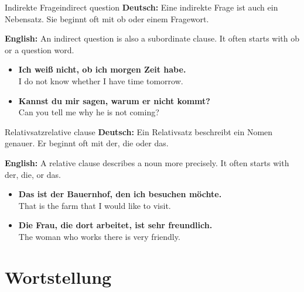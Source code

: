 \documentclass[a4paper,11pt]{article}
\newcommand{\GermanText}[1]{\textbf{Deutsch: }#1\par}
\newcommand{\EnglishText}[1]{{\small\color{SoftGray}\textbf{English: }#1\par}}
\newcommand{\ExampleItem}[2]{\item \textbf{#1}\\{\small\color{SoftGray}#2}}
\begin{document}
        \begin{grammarentry}{Indirekte Frage}{indirect question}
            \GermanText{Eine indirekte Frage ist auch ein Nebensatz. Sie beginnt oft mit ob oder einem Fragewort.}
            \EnglishText{An indirect question is also a subordinate clause. It often starts with ob or a question word.}
            
            \begin{exbox}
                \begin{itemize}
                    \ExampleItem{Ich weiß nicht, ob ich morgen Zeit habe.}{I do not know whether I have time tomorrow.}
                    \ExampleItem{Kannst du mir sagen, warum er nicht kommt?}{Can you tell me why he is not coming?}
                \end{itemize}
            \end{exbox}
        \end{grammarentry}
        
        \begin{grammarentry}{Relativsatz}{relative clause}
            \GermanText{Ein Relativsatz beschreibt ein Nomen genauer. Er beginnt oft mit der, die oder das.}
            \EnglishText{A relative clause describes a noun more precisely. It often starts with der, die, or das.}
            
            \begin{exbox}
                \begin{itemize}
                    \ExampleItem{Das ist der Bauernhof, den ich besuchen möchte.}{That is the farm that I would like to visit.}
                    \ExampleItem{Die Frau, die dort arbeitet, ist sehr freundlich.}{The woman who works there is very friendly.}
                \end{itemize}
            \end{exbox}
        \end{grammarentry}
    
    
    \section{Wortstellung}
        
\end{document}
